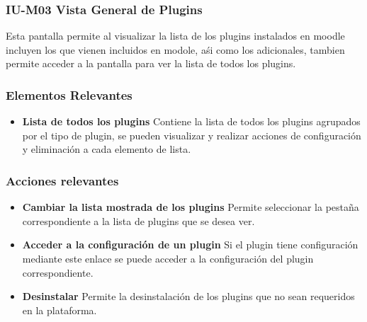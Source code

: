 
\subsubsection{IU-M03 Vista General de Plugins}

 Esta pantalla permite al  visualizar la lista de los plugins
 instalados en moodle incluyen los que vienen incluidos en modole, aśi como los
 adicionales, tambien permite acceder a la pantalla  para ver la
 lista de todos los plugins.


\subsubsection{Elementos Relevantes}

    \begin{itemize}
    \item {\bf Lista de todos los plugins}
        Contiene la lista de todos los plugins agrupados por el tipo de plugin, 
        se pueden visualizar y realizar acciones de configuración y eliminación
        a cada elemento de lista.
    \end{itemize}

\subsubsection{Acciones relevantes}

    \begin{itemize}
    \item {\bf Cambiar la lista mostrada de los plugins}
        Permite seleccionar la pestaña correspondiente a la lista de plugins
        que se desea ver.
    \item {\bf Acceder a la configuración de un plugin}
        Si el plugin tiene configuración mediante este enlace se puede acceder
        a la configuración del plugin correspondiente.
    \item {\bf Desinstalar}
        Permite la desinstalación de los plugins que no sean requeridos en la
        plataforma.
    \end{itemize}

\clearpage
